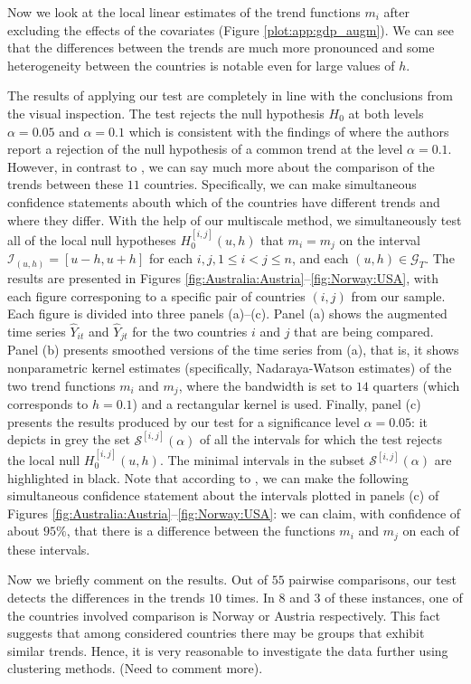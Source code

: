 \documentclass[a4paper,12pt]{article}
\makeatletter
\renewcommand{\eqref}[1]{\tagform@{\ref{#1}}}
\makeatother
\begin{document}
{Now we look at the local linear estimates of the trend functions $m_i$ after excluding the effects of the covariates (Figure \ref{plot:app:gdp_augm}). We can see that the differences between the trends are much more pronounced and some heterogeneity between the countries is notable even for large values of $h$.

The results of applying our test are completely in line with the conclusions from the visual inspection. The test rejects the null hypothesis $H_0$ at both levels $\alpha =0.05$ and $\alpha = 0.1$ which is consistent with the findings of \cite{Zhang2012} where the authors report a rejection of the null hypothesis of a common trend at the level $\alpha = 0.1$. However, in contrast to \cite{Zhang2012}, we can say much more about the comparison of the trends between these $11$ countries. Specifically, we can make simultaneous confidence statements abouth which of the countries have different trends and where they differ. With the help of our multiscale method, we simultaneously test all of the local null hypotheses $H_0^{[i,j]}(u, h)$ that $m_i = m_j$ on the interval $\mathcal{I}_{(u, h)} = [u-h, u+h]$ for each $i, j, 1 \le i < j \le n$, and each $(u, h) \in \mathcal{G}_T$. The results are presented in Figures \ref{fig:Australia:Austria}--\ref{fig:Norway:USA}, with each figure corresponing to a specific pair of countries $(i,j)$ from our sample. Each figure is divided into three panels (a)--(c).  Panel (a) shows the augmented time series $\widehat{Y}_{it}$ and $\widehat{Y}_{jt}$ for the two countries $i$ and $j$ that are being compared. Panel (b) presents smoothed versions of the time series from (a), that is, it shows nonparametric kernel estimates (specifically, Nadaraya-Watson estimates) of the two trend functions $m_i$ and $m_j$, where the bandwidth is set to $14$ quarters (which corresponds to $h = 0.1$) and a rectangular kernel is used. Finally, panel (c) presents the results produced by our test for a significance level $\alpha = 0.05$: it depicts in grey the set $\mathcal{S}^{[i,j]}(\alpha)$ of all the intervals for which the test rejects the local null $H_0^{[i, j]}(u, h)$. The minimal intervals in the subset $\mathcal{S}^{[i,j]}(\alpha)$ are highlighted in black. Note that according to \eqref{corollary1}, we can make the following simultaneous confidence statement about the intervals plotted in panels (c) of Figures \ref{fig:Australia:Austria}--\ref{fig:Norway:USA}: we can claim, with confidence of about $95\%$, that there is a difference between the functions $m_i$ and $m_j$ on each of these intervals. 

Now we briefly comment on the results. Out of $55$ pairwise comparisons, our test detects the differences in the trends $10$ times. In $8$ and $3$ of these instances, one of the countries involved comparison is Norway or Austria respectively. This fact suggests that among considered countries there may be groups that exhibit similar trends. Hence, it is very reasonable to investigate the data further using clustering methods. (Need to comment more).}
\end{document}
